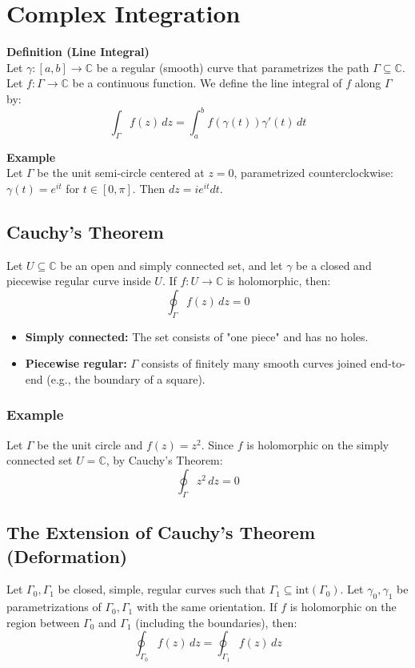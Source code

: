 \section{Complex Integration}

\textbf{Definition (Line Integral)} \\
Let $\gamma : [a,b] \rightarrow \mathbb{C}$ be a regular (smooth) curve that parametrizes the path $\Gamma \subseteq \mathbb{C}$. Let $f: \Gamma \rightarrow \mathbb{C}$ be a continuous function. We define the line integral of $f$ along $\Gamma$ by:
\begin{equation*}
    \int_\Gamma f(z) \, dz = \int_a^b f(\gamma(t)) \gamma'(t) \, dt
\end{equation*}

\textbf{Example} \\
Let $\Gamma$ be the unit semi-circle centered at $z=0$, parametrized counterclockwise: $\gamma(t) = e^{it}$ for $t \in [0, \pi]$. Then $dz = i e^{it} dt$.

\subsection{Cauchy's Theorem}
Let $U \subseteq \mathbb{C}$ be an open and simply connected set, and let $\gamma$ be a closed and piecewise regular curve inside $U$. If $f: U \rightarrow \mathbb{C}$ is holomorphic, then:
\begin{equation*}
    \oint_\Gamma f(z) \, dz = 0
\end{equation*}

\begin{itemize}
    \item \textbf{Simply connected:} The set consists of "one piece" and has no holes.
    \item \textbf{Piecewise regular:} $\Gamma$ consists of finitely many smooth curves joined end-to-end (e.g., the boundary of a square).
\end{itemize}

\subsubsection{Example}
Let $\Gamma$ be the unit circle and $f(z) = z^2$. Since $f$ is holomorphic on the simply connected set $U = \mathbb{C}$, by Cauchy's Theorem:
\begin{equation*}
    \oint_\Gamma z^2 \, dz = 0
\end{equation*}

\subsection{The Extension of Cauchy's Theorem (Deformation)}
Let $\Gamma_0, \Gamma_1$ be closed, simple, regular curves such that $\Gamma_1 \subseteq \text{int}(\Gamma_0)$. Let $\gamma_0, \gamma_1$ be parametrizations of $\Gamma_0, \Gamma_1$ with the same orientation. If $f$ is holomorphic on the region between $\Gamma_0$ and $\Gamma_1$ (including the boundaries), then:
\begin{equation*}
    \oint_{\Gamma_0} f(z) \, dz = \oint_{\Gamma_1} f(z) \, dz
\end{equation*}

